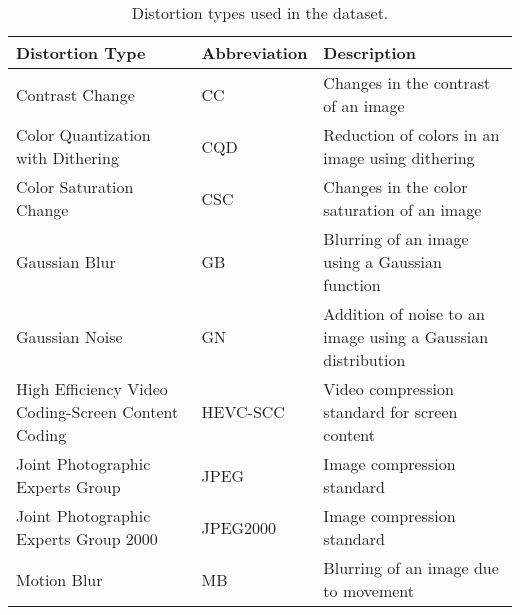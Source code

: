 \begin{table}[h]
\centering
\caption{Distortion types used in the dataset.}
\begin{tabular}{|p{6cm}|l|p{6cm}|}
\hline
\textbf{Distortion Type} & \textbf{Abbreviation} & \textbf{Description} \\
\hline
Contrast Change & CC & Changes in the contrast of an image \\
\hline
Color Quantization with Dithering & CQD & Reduction of colors in an image using dithering \\
\hline
Color Saturation Change & CSC & Changes in the color saturation of an image \\
\hline
Gaussian Blur & GB & Blurring of an image using a Gaussian function \\
\hline
Gaussian Noise & GN & Addition of noise to an image using a Gaussian distribution \\
\hline
High Efficiency Video Coding-Screen Content Coding & HEVC-SCC & Video compression standard for screen content \\
\hline
Joint Photographic Experts Group & JPEG & Image compression standard \\
\hline
Joint Photographic Experts Group 2000 & JPEG2000 & Image compression standard \\
\hline
Motion Blur & MB & Blurring of an image due to movement \\
\hline
\end{tabular}
\label{tab:distortion_types}
\end{table}


